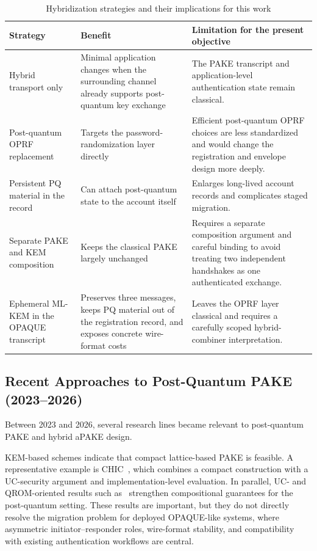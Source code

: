 \documentclass[preprint,12pt]{elsarticle}
\theoremstyle{remark}
\begin{document}
\begin{table}[htbp]
\caption{Hybridization strategies and their implications for this work}
\label{tab:design-alternatives}
\centering\scriptsize
\begin{tabularx}{\textwidth}{@{}L{3.2cm}L{4.5cm}X@{}}
\toprule
Strategy & Benefit & Limitation for the present objective \\
\midrule
Hybrid transport only & Minimal application changes when the surrounding
channel already supports post-quantum key exchange & The PAKE transcript
and application-level authentication state remain classical. \\
Post-quantum OPRF replacement & Targets the password-randomization layer
directly & Efficient post-quantum OPRF choices are less standardized and
would change the registration and envelope design more deeply. \\
Persistent PQ material in the record & Can attach post-quantum state to
the account itself & Enlarges long-lived account records and complicates
staged migration. \\
Separate PAKE and KEM composition & Keeps the classical PAKE largely
unchanged & Requires a separate composition argument and careful binding
to avoid treating two independent handshakes as one authenticated
exchange. \\
Ephemeral ML-KEM in the OPAQUE transcript & Preserves three messages,
keeps PQ material out of the registration record, and exposes concrete
wire-format costs & Leaves the OPRF layer classical and requires a
carefully scoped hybrid-combiner interpretation. \\
\bottomrule
\end{tabularx}
\end{table}

\subsection{Recent Approaches to Post-Quantum PAKE (2023--2026)}

Between 2023 and 2026, several research lines became relevant to
post-quantum PAKE and hybrid aPAKE design.

KEM-based schemes indicate that compact lattice-based PAKE is feasible.
A representative example is CHIC~\cite{arriaga2024}, which
combines a compact construction with a UC-security argument and
implementation-level evaluation. In parallel, UC- and QROM-oriented
results such as~\cite{lyu2024uc} strengthen compositional guarantees
for the post-quantum setting. These results are important, but they do
not directly resolve the migration problem for deployed OPAQUE-like
systems, where asymmetric initiator--responder roles, wire-format stability,
and compatibility with existing authentication workflows are central.
\end{document}
